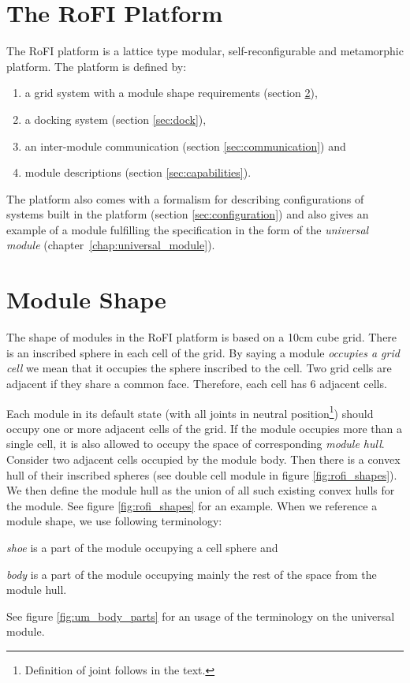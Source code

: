\section{The RoFI Platform }

The RoFI platform is a lattice type modular, self-reconfigurable and metamorphic
platform. The platform is defined by:
\begin{enumerate}
    \item a grid system with a module shape requirements (section \ref{sec:aware}),
    \item a docking system (section \ref{sec:dock}),
    \item an inter-module communication (section \ref{sec:communication}) and
    \item module descriptions (section \ref{sec:capabilities}).
\end{enumerate}

The platform also comes with a formalism for describing configurations of
systems built in the platform (section \ref{sec:configuration}) and also gives
an example of a module fulfilling the specification in the form of the
\emph{universal module} (chapter~\ref{chap:universal_module}).

\section{Module Shape}\label{sec:aware}

The shape of modules in the RoFI platform is based on a 10cm cube grid. There is
an inscribed sphere in each cell of the grid. By saying a module \emph{occupies
a grid cell} we mean that it occupies the sphere inscribed to the cell. Two grid
cells are adjacent if they share a common face. Therefore, each cell has 6
adjacent cells.

Each module in its default state (with all joints in neutral
position\footnote{Definition of joint follows in the text.}) should occupy one
or more adjacent cells of the grid. If the module occupies more than a single
cell, it is also allowed to occupy the space of corresponding \emph{module
hull}. Consider two adjacent cells occupied by the module body. Then there is a
convex hull of their inscribed spheres (see double cell module in figure
\ref{fig:rofi_shapes}). We then define the module hull as the union of all such
existing convex hulls for the module. See figure \ref{fig:rofi_shapes} for an
example. When we reference a module shape, we use following terminology:
\begin{enumerate*}
    \item \emph{shoe} is a part of the module occupying a cell sphere and
    \item \emph{body} is a part of the module occupying mainly the rest of the
    space from the module hull.
\end{enumerate*}
See figure \ref{fig:um_body_parts} for an usage of the terminology on the
universal module.

